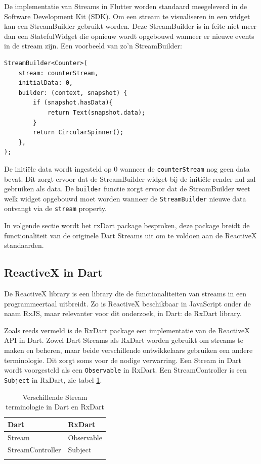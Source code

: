 De implementatie van Streams in Flutter worden standaard meegeleverd in de Software Development Kit (SDK). Om een stream te visualiseren in een widget kan een StreamBuilder gebruikt worden. Deze StreamBuilder is in feite niet meer dan een StatefulWidget die opnieuw wordt opgebouwd wanneer er nieuwe events in de stream zijn.
Een voorbeeld van zo'n StreamBuilder:
\begin{verbatim}
StreamBuilder<Counter>(
    stream: counterStream,
    initialData: 0,
    builder: (context, snapshot) {
        if (snapshot.hasData){
            return Text(snapshot.data);
        }
        return CircularSpinner();
    },
);
\end{verbatim}
De initiële data wordt ingesteld op 0 wanneer de \verb|counterStream| nog geen data bevat. Dit zorgt ervoor dat de StreamBuilder widget bij de initiële render nul zal gebruiken als data. De \verb|builder| functie zorgt ervoor dat de StreamBuilder weet welk widget opgebouwd moet worden wanneer de \verb|StreamBuilder| nieuwe data ontvangt via de \verb|stream| property.

In volgende sectie wordt het rxDart package besproken, deze package breidt de functionaliteit van de originele Dart Streams uit om te voldoen aan de ReactiveX standaarden.

\subsection*{ReactiveX in Dart}
\label{ch:reactivex}
De ReactiveX library is een library die de functionaliteiten van streams in een programmeertaal uitbreidt. Zo is ReactiveX beschikbaar in JavaScript onder de naam RxJS, maar relevanter voor dit onderzoek, in Dart: de RxDart library.


Zoals reeds vermeld is de RxDart package een implementatie van de ReactiveX API in Dart. Zowel Dart Streams als RxDart worden gebruikt om streams te maken en beheren, maar beide verschillende ontwikkelaars gebruiken een andere terminologie. Dit zorgt soms voor de nodige verwarring.
Een Stream in Dart wordt voorgesteld als een \verb|Observable| in RxDart. Een StreamController is een \verb|Subject| in RxDart, zie tabel \ref{table:terminologie-rxdart-dart}.

\begin{table}[H]
    \centering
    \begin{tabular}{ll}
        \textbf{Dart}    & \textbf{RxDart} \\ \hline
        Stream           & Observable      \\
        StreamController & Subject         \\
        &                
    \end{tabular}
    \caption{Verschillende Stream terminologie in Dart en RxDart \textcite{Boelens2018}}
    \label{table:terminologie-rxdart-dart}
\end{table}

